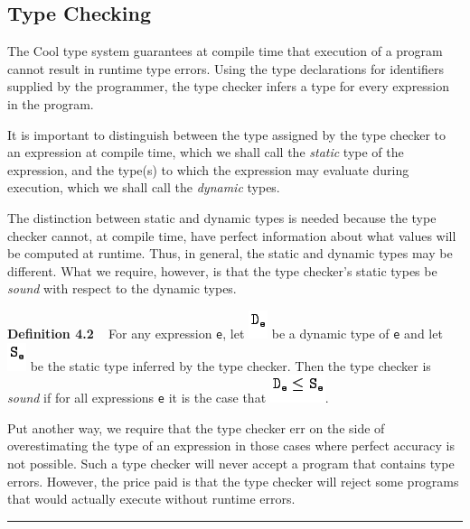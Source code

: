 \documentclass[]{article}
\begin{document}
\subsection{Type Checking}

The Cool type system guarantees at compile time that execution of a
program cannot result in runtime type errors. Using the type
declarations for identifiers supplied by the programmer, the type
checker infers a type for every expression in the program.

It is important to distinguish between the type assigned by the type
checker to an expression at compile time, which we shall call the
\emph{static} type of the expression, and the type(s) to which the
expression may evaluate during execution, which we shall call the
\emph{dynamic} types.

The distinction between static and dynamic types is needed because the
type checker cannot, at compile time, have perfect information about
what values will be computed at runtime. Thus, in general, the static
and dynamic types may be different. What we require, however, is that
the type checker's static types be \emph{sound} with respect to the
dynamic types.

\textbf{Definition 4.2} ~ For any expression \texttt{e}, let
\includegraphics{img13.png} be a dynamic type of \texttt{e} and let
\includegraphics{img14.png} be the static type inferred by the type
checker. Then the type checker is \emph{sound} if for all expressions
\texttt{e} it is the case that \includegraphics{img15.png}.

Put another way, we require that the type checker err on the side of
overestimating the type of an expression in those cases where perfect
accuracy is not possible. Such a type checker will never accept a
program that contains type errors. However, the price paid is that the
type checker will reject some programs that would actually execute
without runtime errors.

\begin{center}\rule{3in}{0.4pt}\end{center}
\end{document}
